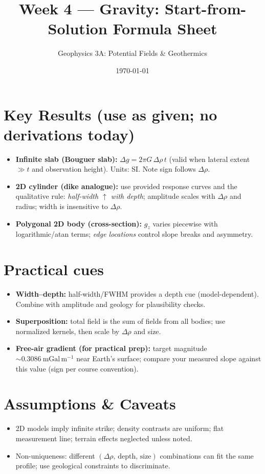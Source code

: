 \documentclass[11pt,a4paper]{article}
\title{Week 4 --- Gravity: Start-from-Solution Formula Sheet}
\author{Geophysics 3A: Potential Fields \& Geothermics}
\date{\today}
\begin{document}
\maketitle
\vspace{-1em}

\section*{Key Results (use as given; no derivations today)}
\begin{itemize}
  \item \textbf{Infinite slab (Bouguer slab):} $\displaystyle \Delta g = 2\pi G\,\Delta\rho\,t$ \quad (valid when lateral extent $\gg t$ and observation height). Units: SI. Note sign follows $\Delta\rho$. 
  \item \textbf{2D cylinder (dike analogue):} use provided response curves and the qualitative rule: \emph{half-width $\uparrow$ with depth}; amplitude scales with $\Delta\rho$ and radius; width is insensitive to $\Delta\rho$.
  \item \textbf{Polygonal 2D body (cross-section):} $g_z$ varies piecewise with logarithmic/atan terms; \emph{edge locations} control slope breaks and asymmetry.
\end{itemize}

\section*{Practical cues}
\begin{itemize}
  \item \textbf{Width--depth:} half-width/FWHM provides a depth cue (model-dependent). Combine with amplitude and geology for plausibility checks.
  \item \textbf{Superposition:} total field is the sum of fields from all bodies; use normalized kernels, then scale by $\Delta\rho$ and size.
  \item \textbf{Free-air gradient (for practical prep):} target magnitude $\sim 0.3086~\mathrm{mGal\,m^{-1}}$ near Earth's surface; compare your measured slope against this value (sign per course convention).
\end{itemize}

\section*{Assumptions \& Caveats}
\begin{itemize}
  \item 2D models imply infinite strike; density contrasts are uniform; flat measurement line; terrain effects neglected unless noted.
  \item Non-uniqueness: different $(\Delta\rho,\,\text{depth},\,\text{size})$ combinations can fit the same profile; use geological constraints to discriminate.
\end{itemize}
\end{document}
